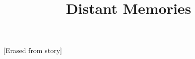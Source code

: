 \documentclass[11pt]{article}
\begin{document}
\ttfamily
\title{Distant Memories}
\maketitle



[Erased from story]
\end{document}
